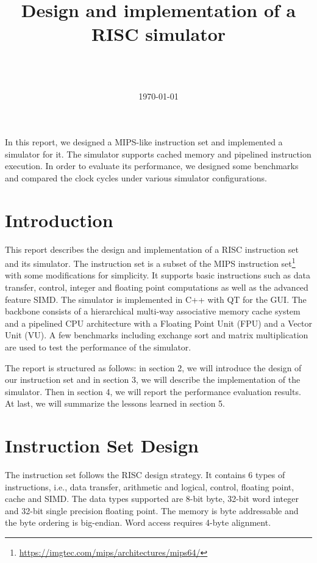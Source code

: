 \documentclass{sig-alternate}
\begin{document}
\title{Design and implementation of a RISC simulator}
\author{
\and
{} \\  \\
}

\date{\today}
\maketitle
\abstract
In this report, we designed a MIPS-like instruction set and implemented a simulator for it. The simulator supports cached memory and pipelined instruction execution. In order to evaluate its performance, we designed some benchmarks and compared the clock cycles under various simulator configurations.

\section{Introduction}
This report describes the design and implementation of a RISC instruction set and its simulator. The instruction set is a subset of the MIPS instruction set\footnote{\url{https://imgtec.com/mips/architectures/mips64/}} with some modifications for simplicity. It supports basic instructions such as data transfer, control, integer and floating point computations as well as the advanced feature SIMD. The simulator is implemented in C++ with QT for the GUI. The backbone consists of a hierarchical multi-way associative memory cache system and a pipelined CPU architecture with a Floating Point Unit (FPU) and a Vector Unit (VU). A few benchmarks including exchange sort and matrix multiplication are used to test the performance of the simulator.

The report is structured as follows: in section 2, we will introduce the design of our instruction set and in section 3, we will describe the implementation of the simulator. Then in section 4, we will report the performance evaluation results.  At last, we will summarize the lessons learned in section 5.

\section{Instruction Set Design}
The instruction set follows the RISC design strategy. It contains 6 types of instructions, i.e., data transfer, arithmetic and logical, control, floating point, cache and SIMD. The data types supported are 8-bit byte, 32-bit word integer and 32-bit single precision floating point. The memory is byte addressable and the byte ordering is big-endian. Word access requires 4-byte alignment. 
\end{document}
